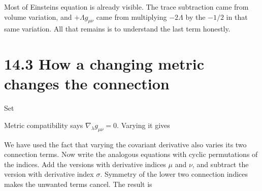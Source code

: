 \documentclass[
  11pt,
  letterpaper,
  oneside,
  openany]{scrbook}
\begin{document}
\begin{center}
\begingroup
{}
\ifdim\wd\grmathbox>\linewidth
\resizebox{\linewidth}{!}{\usebox{\grmathbox}}
\else\usebox{\grmathbox}\fi
\endgroup
\end{center}

Most of Einstein\textquotesingle s equation is already visible. The
trace subtraction came from volume variation, and
\(+\Lambda g_{\mu\nu}\) came from multiplying \(-2\Lambda\) by the
\(-1/2\) in that same variation. All that remains is to understand the
last term honestly.

\hypertarget{how-a-changing-metric-changes-the-connection}{%
\section{14.3 How a changing metric changes the
connection}\label{how-a-changing-metric-changes-the-connection}}

Set

\begin{center}
\begingroup
{}
\ifdim\wd\grmathbox>\linewidth
\resizebox{\linewidth}{!}{\usebox{\grmathbox}}
\else\usebox{\grmathbox}\fi
\endgroup
\end{center}

Metric compatibility says \(\nabla_\lambda g_{\mu\nu}=0\). Varying it
gives

\begin{center}
\begingroup
{}
\ifdim\wd\grmathbox>\linewidth
\resizebox{\linewidth}{!}{\usebox{\grmathbox}}
\else\usebox{\grmathbox}\fi
\endgroup
\end{center}

We have used the fact that varying the covariant derivative also varies
its two connection terms. Now write the analogous equations with cyclic
permutations of the indices. Add the versions with derivative indices
\(\mu\) and \(\nu\), and subtract the version with derivative index
\(\sigma\). Symmetry of the lower two connection indices makes the
unwanted terms cancel. The result is
\end{document}

